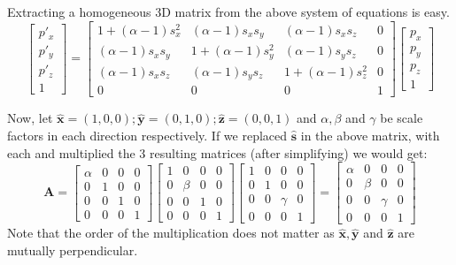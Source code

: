 \documentclass[]{report}   %
\begin{document}
Extracting a homogeneous 3D matrix from the above system of equations is easy.
\[
	\begin{bmatrix}
	p\prime_x \\
	p\prime_y \\
	p\prime_z \\
	1
	\end{bmatrix}
	=	
	\begin{bmatrix}
	1 + (\alpha - 1)s_x^2 & (\alpha - 1)s_x s_y & (\alpha - 1)s_x s_z &  0  \\
	(\alpha - 1)s_x s_y & 1 + (\alpha - 1)s_y^2 & (\alpha - 1)s_y s_z &  0  \\
	(\alpha - 1)s_x s_z & (\alpha - 1)s_y s_z  & 1 + (\alpha - 1)s_z^2 & 0  \\
	0 & 0 & 0 &	1
	\end{bmatrix}
	\begin{bmatrix}
		p_x \\
		p_y \\
		p_z \\
		1
	\end{bmatrix}
\]


Now, let \(\mathbf{\hat{x}} =(1,0,0); \mathbf{\hat{y}} =(0,1,0); \mathbf{\hat{z}} =(0,0,1)\) and \(\alpha,\beta\) and \(\gamma\) be scale factors in each direction respectively. If we replaced \(\mathbf{\hat{s}}\) in the above matrix, with each and multiplied the 3 resulting matrices (after simplifying) we would get:
\[
	\mathbf{A} =
	\begin{bmatrix}
		\alpha & 0 & 0 & 0 \\
		0 &	1 & 0 & 0 \\
		0 & 0 & 1 &	0 \\
		0 & 0 & 0 &	1
	\end{bmatrix}
	\begin{bmatrix}
		1 & 0 & 0 & 0 \\
		0 &	\beta & 0 & 0 \\
		0 & 0 & 1 &	0 \\
		0 & 0 & 0 &	1
	\end{bmatrix}
	\begin{bmatrix}
		1 & 0 & 0 & 0 \\
		0 &	1 & 0 & 0 \\
		0 & 0 & \gamma &	0 \\
		0 & 0 & 0 &	1
	\end{bmatrix}
	=
	\begin{bmatrix}
		\alpha & 0 & 0 & 0 \\
		0 &	\beta & 0 & 0 \\
		0 & 0 & \gamma &	0 \\
		0 & 0 & 0 &	1
	\end{bmatrix}	
\]
Note that the order of the multiplication does not matter as \(\mathbf{\hat{x}}, \mathbf{\hat{y}}\) and \(\mathbf{\hat{z}}\) are mutually perpendicular.
\end{document}
